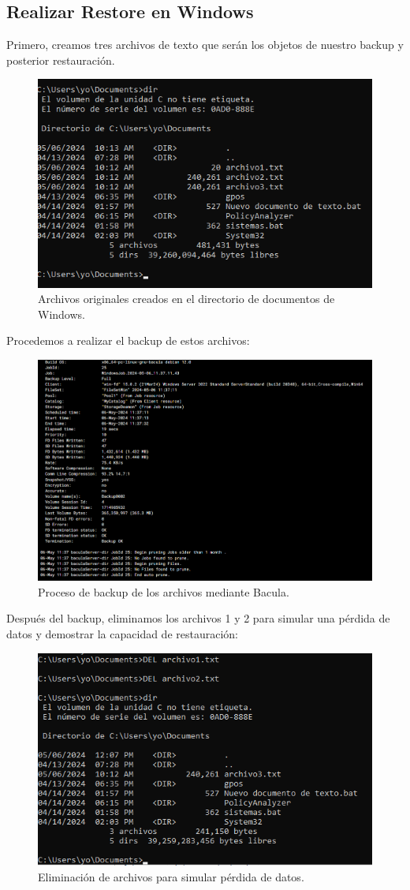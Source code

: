 \subsection{Realizar Restore en Windows}

Primero, creamos tres archivos de texto que serán los objetos de nuestro backup y posterior restauración.

\begin{figure}[H]
    \centering
    \includegraphics[width=0.5\linewidth]{instalacionBacula/archivosWin.png}
    \caption{Archivos originales creados en el directorio de documentos de Windows.}
\end{figure}

Procedemos a realizar el backup de estos archivos:

\begin{figure}[H]
    \centering
    \includegraphics[width=0.5\linewidth]{instalacionBacula/backupWindows.png}
    \caption{Proceso de backup de los archivos mediante Bacula.}
\end{figure}

Después del backup, eliminamos los archivos 1 y 2 para simular una pérdida de datos y demostrar la capacidad de restauración:

\begin{figure}[H]
    \centering
    \includegraphics[width=0.5\linewidth]{instalacionBacula/borrarArchivosWin.png}
    \caption{Eliminación de archivos para simular pérdida de datos.}
\end{figure}

